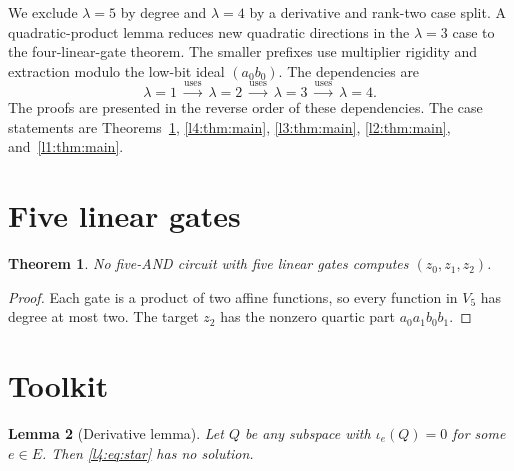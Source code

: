 \documentclass[11pt,a4paper]{article}
\theoremstyle{plain}
\newtheorem{theorem}{Theorem}
\newtheorem{lemma}[theorem]{Lemma}
\theoremstyle{remark}
\newcommand{\Dir}{E}
\begin{document}
We exclude $\lambda=5$ by degree and $\lambda=4$ by a derivative and rank-two case split. A quadratic-product lemma reduces new quadratic directions in the $\lambda=3$ case to the four-linear-gate theorem. The smaller prefixes use multiplier rigidity and extraction modulo the low-bit ideal $(a_0b_0)$. The dependencies are
\[
\boxed{\lambda=1}\ \xrightarrow{\text{uses}}\
\boxed{\lambda=2}\ \xrightarrow{\text{uses}}\
\boxed{\lambda=3}\ \xrightarrow{\text{uses}}\
\boxed{\lambda=4}.
\]
The proofs are presented in the reverse order of these dependencies. The case statements are Theorems~\ref{thm:lambda5}, \ref{l4:thm:main}, \ref{l3:thm:main}, \ref{l2:thm:main}, and~\ref{l1:thm:main}.

\section{Five linear gates}\label{sec:lambda5}
\begin{theorem}\label{thm:lambda5}
No five-AND circuit with five linear gates computes $(z_0,z_1,z_2)$.
\end{theorem}
\begin{proof}
Each gate is a product of two affine functions, so every function in $V_5$ has degree at most two. The target $z_2$ has the nonzero quartic part $a_0a_1b_0b_1$.
\end{proof}

\section{Toolkit}\label{sec:toolkit}

\begin{lemma}[Derivative lemma]\label{l4:lem:deriv}
Let $Q$ be any subspace with $\iota_e(Q)=0$ for some $e\in\Dir$. Then \eqref{l4:eq:star} has no solution.
\end{lemma}
\end{document}
